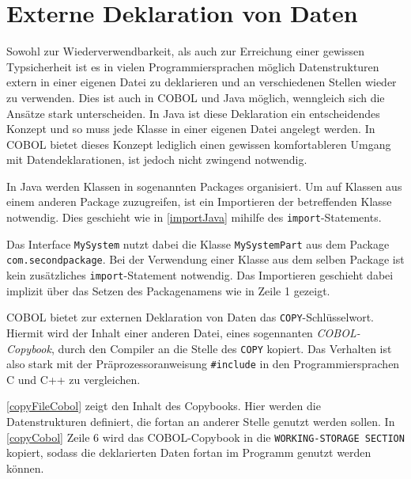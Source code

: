 \section{Externe Deklaration von Daten} 
  
Sowohl zur Wiederverwendbarkeit, als auch zur Erreichung einer gewissen Typsicherheit ist es in vielen Programmiersprachen möglich Datenstrukturen extern in einer eigenen Datei zu deklarieren und an verschiedenen Stellen wieder zu verwenden. Dies ist auch in COBOL und Java möglich, wenngleich sich die Ansätze stark unterscheiden. In Java ist diese Deklaration ein entscheidendes Konzept und so muss jede Klasse in einer eigenen Datei angelegt werden. In COBOL bietet dieses Konzept lediglich einen gewissen komfortableren Umgang mit Datendeklarationen, ist jedoch nicht zwingend notwendig.

In Java werden Klassen in sogenannten Packages organisiert. Um auf Klassen aus einem anderen Package zuzugreifen, ist ein Importieren der betreffenden Klasse notwendig. Dies geschieht wie in \autoref{importJava} mihilfe des \texttt{import}-Statements.

Das Interface \texttt{MySystem} nutzt dabei die Klasse \texttt{MySystemPart} aus dem Package \texttt{com.secondpackage}. Bei der Verwendung einer Klasse aus dem selben Package ist kein zusätzliches \texttt{import}-Statement notwendig. Das Importieren geschieht dabei implizit über das Setzen des Packagenamens wie in Zeile 1 gezeigt.

COBOL bietet zur externen Deklaration von Daten das \texttt{COPY}-Schlüsselwort. Hiermit wird der Inhalt einer anderen Datei, eines sogennanten \textit{COBOL-Copybook}, durch den Compiler an die Stelle des \texttt{COPY} kopiert. Das Verhalten ist also stark mit der Präprozessoranweisung \texttt{#include} in den Programmiersprachen C und C++ zu vergleichen.

\autoref{copyFileCobol} zeigt den Inhalt des Copybooks. Hier werden die Datenstrukturen definiert, die fortan an anderer Stelle genutzt werden sollen. In \autoref{copyCobol} Zeile 6 wird das COBOL-Copybook in die \texttt{WORKING-STORAGE SECTION} kopiert, sodass die deklarierten Daten fortan im Programm genutzt werden können.


